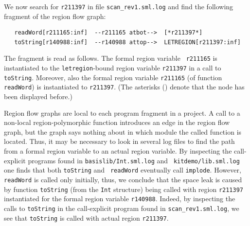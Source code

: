 \documentclass[12pt]{book}
\begin{document}
We now search for \texttt{r211397} in file \texttt{scan\_rev1.sml.log} and
find the following fragment of the region flow graph:
\begin{small}
\begin{verbatim}
   readWord[r211165:inf]  --r211165 atbot-->  [*r211397*]
   toString[r140988:inf]  --r140988 attop-->  LETREGION[r211397:inf]
\end{verbatim}
\end{small}
The fragment is read as follows. The formal region variable {\tt
  r211165} is instantiated to the {\tt letregion}-bound region variable
{\tt r211397} in a call to {\tt toString}. Moreover, also the formal
region variable {\tt r211165} (of function {\tt readWord}) is
instantiated to {\tt r211397}. (The asterisks ({\tt *}) denote that the
node has been displayed before.)

Region flow graphs are local to each program fragment in a project. A
call to a non-local region-polymorphic function introduces an edge in
the region flow graph, but the graph says nothing about in which
module the called function is located. Thus, it may be necessary to
look in several log files to find the path from a formal region
variable to an actual region variable. By inspecting the call-explicit
programs found in {\tt basislib/Int.sml.log} and {\tt
  kitdemo/lib.sml.log} one finds that both {\tt toString} and {\tt
  readWord} eventually call {\tt implode}. However, {\tt readWord} is
called only initially, thus, we conclude that the space leak is caused
by function {\tt toString} (from the {\tt Int} structure) being called
with region {\tt r211397} instantiated for the formal region variable
{\tt r140988}. Indeed, by inspecting the calls to {\tt toString} in the
call-explicit program found in {\tt scan\_rev1.sml.log}, we see that
{\tt toString} is called with actual region {\tt r211397}.
\end{document}
